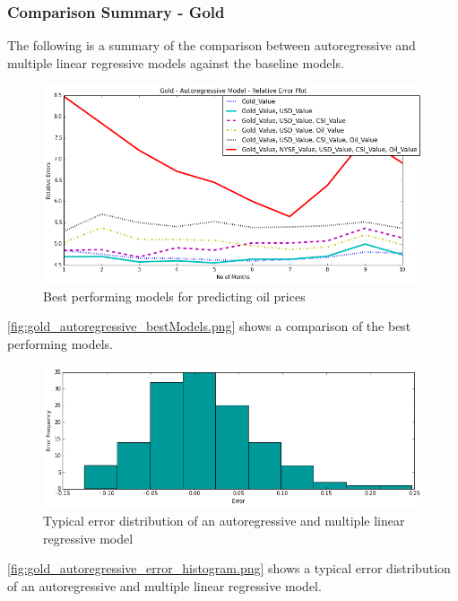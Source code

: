 \documentclass[runningheads]{llncs}
\begin{document}
\newpage
\subsubsection {Comparison Summary - Gold} The following is a summary of the comparison between autoregressive and multiple linear regressive models against the baseline models. \\


\begin{figure}
\centering
\includegraphics[width=\textwidth]{gold_autoregressive_bestModels.png}
\caption{Best performing models for predicting oil prices}
\label{fig:gold_autoregressive_bestModels.png}
\end{figure}

\autoref{fig:gold_autoregressive_bestModels.png} shows a comparison of the best performing models.

\begin{figure}
\centering
\includegraphics[width=\textwidth]{gold_autoregressive_error_histogram.png}
\caption{Typical error distribution of an autoregressive and multiple linear regressive model}
\label{fig:gold_autoregressive_error_histogram.png}
\end{figure}

\autoref{fig:gold_autoregressive_error_histogram.png} shows a typical error distribution of an autoregressive and multiple linear regressive model.
\end{document}
